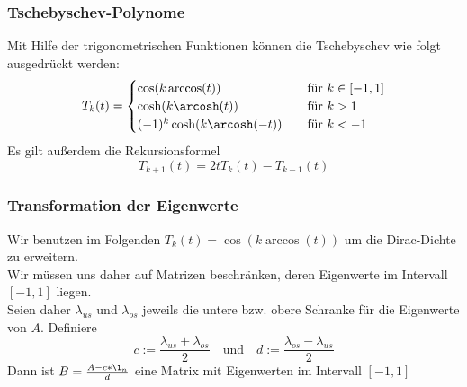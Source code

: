 \begin{frame}
    \frametitle{Tschebyschev-Polynome}
    Mit Hilfe der trigonometrischen Funktionen können die Tschebyschev wie folgt ausgedrückt werden:
    \[ T_k(t) =
    \begin{cases}
        \cos(k \arccos(t))            & \quad \text{für } k \in [-1, 1]\\
        \cosh(k \arcosh(t))           & \quad \text{für } k > 1\\
        (-1)^k \cosh(k \arcosh(-t))   & \quad \text{für } k < -1
    \end{cases}
    \]
    Es gilt außerdem die Rekursionsformel
    $$T_{k + 1}(t) = 2tT_k(t) - T_{k - 1}(t)$$
\end{frame}

\begin{frame}
    \frametitle{Transformation der Eigenwerte}
    Wir benutzen im Folgenden $T_k(t) = \cos(k \arccos(t))$ um die Dirac-Dichte zu erweitern.\\
    Wir müssen uns daher auf Matrizen beschränken, deren Eigenwerte im Intervall $[-1, 1]$ liegen.\\
    Seien daher $\lambda_{us}$ und $\lambda_{os}$ jeweils die untere bzw. obere Schranke für die Eigenwerte von $A$.
    Definiere
    $$c := \frac{\lambda_{us} + \lambda_{os}}{2} \quad \text{und} \quad d := \frac{\lambda_{os} - \lambda_{us}}{2}$$
    Dann ist $B = \frac{A - c*\1_n}{d}$ eine Matrix mit Eigenwerten im Intervall $[-1, 1]$
\end{frame}